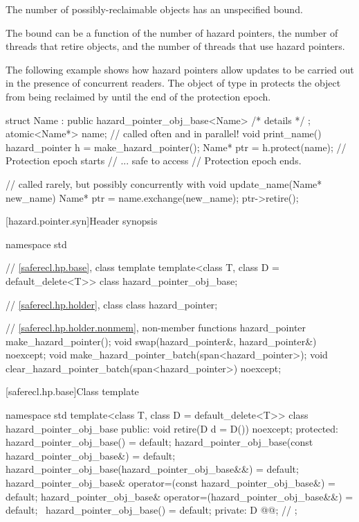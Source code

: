 \pnum
The number of possibly-reclaimable objects has an unspecified bound.
\begin{note}
The bound can be a function of the number of hazard pointers,
the number of threads that retire objects, and
the number of threads that use hazard pointers.
\end{note}
\begin{example}
The following example shows how hazard pointers allow updates to be carried out
in the presence of concurrent readers.
The object of type  in 
protects the object  from being reclaimed by 
until the end of the protection epoch.
\begin{codeblock}
struct Name : public hazard_pointer_obj_base<Name> { /* details */ };
atomic<Name*> name;
// called often and in parallel!
void print_name() {
  hazard_pointer h = make_hazard_pointer();
  Name* ptr = h.protect(name);          // Protection epoch starts
  // ... safe to access 
}                                       // Protection epoch ends.

// called rarely, but possibly concurrently with 
void update_name(Name* new_name) {
  Name* ptr = name.exchange(new_name);
  ptr->retire();
}
\end{codeblock}
\end{example}

[hazard.pointer.syn]{Header  synopsis}

%
\begin{codeblock}
namespace std {
  // \ref{saferecl.hp.base}, class template 
  template<class T, class D = default_delete<T>> class hazard_pointer_obj_base;

  // \ref{saferecl.hp.holder}, class 
  class hazard_pointer;

  // \ref{saferecl.hp.holder.nonmem}, non-member functions
  hazard_pointer make_hazard_pointer();
  void swap(hazard_pointer&, hazard_pointer&) noexcept;
  void make_hazard_pointer_batch(span<hazard_pointer>);
  void clear_hazard_pointer_batch(span<hazard_pointer>) noexcept;
}
\end{codeblock}

[saferecl.hp.base]{Class template }

\begin{codeblock}
namespace std {
  template<class T, class D = default_delete<T>>
  class hazard_pointer_obj_base {
  public:
    void retire(D d = D()) noexcept;
  protected:
    hazard_pointer_obj_base() = default;
    hazard_pointer_obj_base(const hazard_pointer_obj_base&) = default;
    hazard_pointer_obj_base(hazard_pointer_obj_base&&) = default;
    hazard_pointer_obj_base& operator=(const hazard_pointer_obj_base&) = default;
    hazard_pointer_obj_base& operator=(hazard_pointer_obj_base&&) = default;
    ~hazard_pointer_obj_base() = default;
  private:
    D @@;      // \expos
  };
}
\end{codeblock}

